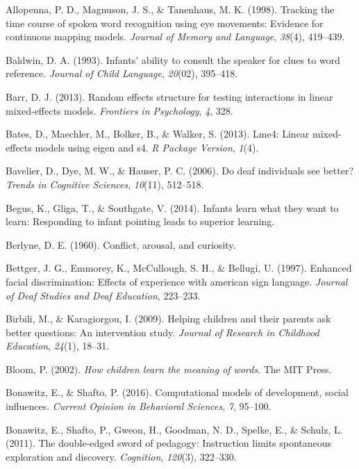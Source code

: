 \documentclass[oneside]{report}
\begin{document}
\hypertarget{ref-allopenna1998tracking}{}
Allopenna, P. D., Magnuson, J. S., \& Tanenhaus, M. K. (1998). Tracking
the time course of spoken word recognition using eye movements: Evidence
for continuous mapping models. \emph{Journal of Memory and Language},
\emph{38}(4), 419--439.

\hypertarget{ref-baldwin1993infants}{}
Baldwin, D. A. (1993). Infants' ability to consult the speaker for clues
to word reference. \emph{Journal of Child Language}, \emph{20}(02),
395--418.

\hypertarget{ref-barr2013random}{}
Barr, D. J. (2013). Random effects structure for testing interactions in
linear mixed-effects models. \emph{Frontiers in Psychology}, \emph{4},
328.

\hypertarget{ref-bates2013lme4}{}
Bates, D., Maechler, M., Bolker, B., \& Walker, S. (2013). Lme4: Linear
mixed-effects models using eigen and s4. \emph{R Package Version},
\emph{1}(4).

\hypertarget{ref-bavelier2006deaf}{}
Bavelier, D., Dye, M. W., \& Hauser, P. C. (2006). Do deaf individuals
see better? \emph{Trends in Cognitive Sciences}, \emph{10}(11),
512--518.

\hypertarget{ref-begus2014infants}{}
Begus, K., Gliga, T., \& Southgate, V. (2014). Infants learn what they
want to learn: Responding to infant pointing leads to superior learning.

\hypertarget{ref-berlyne1960conflict}{}
Berlyne, D. E. (1960). Conflict, arousal, and curiosity.

\hypertarget{ref-bettger1997enhanced}{}
Bettger, J. G., Emmorey, K., McCullough, S. H., \& Bellugi, U. (1997).
Enhanced facial discrimination: Effects of experience with american sign
language. \emph{Journal of Deaf Studies and Deaf Education}, 223--233.

\hypertarget{ref-birbili2009helping}{}
Birbili, M., \& Karagiorgou, I. (2009). Helping children and their
parents ask better questions: An intervention study. \emph{Journal of
Research in Childhood Education}, \emph{24}(1), 18--31.

\hypertarget{ref-bloom2002children}{}
Bloom, P. (2002). \emph{How children learn the meaning of words}. The
MIT Press.

\hypertarget{ref-bonawitz2016computational}{}
Bonawitz, E., \& Shafto, P. (2016). Computational models of development,
social influences. \emph{Current Opinion in Behavioral Sciences},
\emph{7}, 95--100.

\hypertarget{ref-bonawitz2011double}{}
Bonawitz, E., Shafto, P., Gweon, H., Goodman, N. D., Spelke, E., \&
Schulz, L. (2011). The double-edged sword of pedagogy: Instruction
limits spontaneous exploration and discovery. \emph{Cognition},
\emph{120}(3), 322--330.
\end{document}
